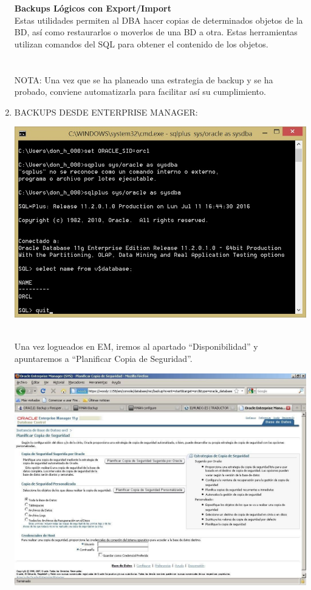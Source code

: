\begin{enumerate}[1.]
	\textbf{Backups Lógicos con Export/Import}  
	\\Estas utilidades permiten al DBA hacer copias de determinados objetos de la BD, así como restaurarlos o moverlos de una BD a otra. Estas herramientas utilizan comandos del SQL para obtener el contenido de los objetos.\\
	\\
	\\NOTA: Una vez que se ha planeado una estrategia de backup y se ha probado, conviene automatizarla para facilitar así su cumplimiento.

	\item BACKUPS  DESDE  ENTERPRISE  MANAGER:
	
\begin{center}
	\includegraphics[width=15cm]{./Imagenes/img-4-2-1}  
	\end{center}
	\\Una  vez  logueados  en  EM,  iremos  al  apartado  “Disponibilidad”  y  apuntaremos  a “Planificar  Copia de Seguridad”.
	\begin{center}
	\includegraphics[width=15cm]{./Imagenes/img-4-2-2}  

\end{center}
\end{enumerate}
